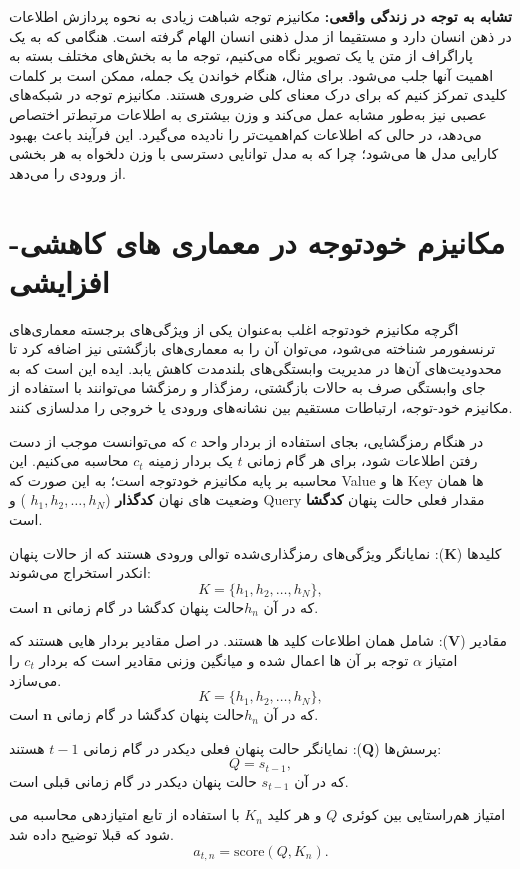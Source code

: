\textbf{تشابه به توجه در زندگی واقعی:}  
مکانیزم توجه شباهت زیادی به نحوه پردازش اطلاعات در ذهن انسان دارد و مستقیما از مدل ذهنی انسان الهام گرفته است. هنگامی که به یک پاراگراف از متن یا یک تصویر نگاه می‌کنیم، توجه ما به بخش‌های مختلف بسته به اهمیت آنها جلب می‌شود. برای مثال، هنگام خواندن یک جمله، ممکن است بر کلمات کلیدی تمرکز کنیم که برای درک معنای کلی ضروری هستند. مکانیزم توجه در شبکه‌های عصبی نیز به‌طور مشابه عمل می‌کند و وزن بیشتری به اطلاعات مرتبط‌تر اختصاص می‌دهد، در حالی که اطلاعات کم‌اهمیت‌تر را نادیده می‌گیرد. این فرآیند باعث بهبود کارایی مدل ها می‌شود؛ چرا که به مدل توانایی دسترسی با وزن دلخواه به هر بخشی از ورودی را می‌دهد.

\section{مکانیزم خودتوجه در معماری های کاهشی-افزایشی}
اگرچه مکانیزم خودتوجه اغلب به‌عنوان یکی از ویژگی‌های برجسته معماری‌های ترنسفورمر شناخته می‌شود، می‌توان آن را به معماری‌های بازگشتی نیز اضافه کرد تا محدودیت‌های آن‌ها در مدیریت وابستگی‌های بلندمدت کاهش یابد. ایده این است که به جای وابستگی صرف به حالات بازگشتی، رمزگذار و رمزگشا می‌توانند با استفاده از مکانیزم خود-توجه، ارتباطات مستقیم بین نشانه‌های ورودی یا خروجی را مدلسازی کنند.

در هنگام رمزگشایی‌، بجای استفاده از بردار واحد $c$ که می‌توانست موجب از دست رفتن اطلاعات شود،‌ برای هر گام زمانی $t$ یک بردار زمینه $c_t$ محاسبه می‌کنیم. این محاسبه بر پایه مکانیزم خودتوجه است؛ به این صورت که Value ها و Key ها همان وضعیت های نهان  \textbf{کدگذار} (${h_1, h_2, \dots, h_N}$ ) و Query مقدار فعلی حالت پنهان \textbf{کدگشا} است.  

کلیدها ($\mathbf{K}$): نمایانگر ویژگی‌های رمزگذاری‌شده توالی ورودی هستند که از حالات پنهان انکدر استخراج می‌شوند: 
$$
K = \{h_1, h_2, \dots, h_N\},
$$
که در آن $ h_n $​ حالت پنهان کدگشا در گام زمانی $\mathbf{n}$ است.

مقادیر ($\mathbf{V}$): شامل همان اطلاعات کلید ها هستند. در اصل مقادیر بردار هایی هستند که امتیاز $\alpha$ توجه بر آن ها اعمال شده و میانگین وزنی مقادیر است که بردار $c_t$ را می‌سازد.
$$
K = \{h_1, h_2, \dots, h_N\},
$$
که در آن $ h_n $​ حالت پنهان کدگشا در گام زمانی $\mathbf{n}$ است.


پرسش‌ها ($\mathbf{Q}$):
نمایانگر حالت پنهان فعلی دیکدر در گام زمانی  $t-1 $ هستند:  
$$
Q = s_{t-1},
$$
که در آن \( s_{t-1} \) حالت پنهان دیکدر در گام زمانی قبلی است.

امتیاز هم‌راستایی بین کوئری $Q$ و هر کلید $ K_n $  با استفاده از تابع امتیازدهی محاسبه می شود که قبلا توضیح داده شد.
$$
a_{t, n} = \text{score}(Q, K_n).
$$

